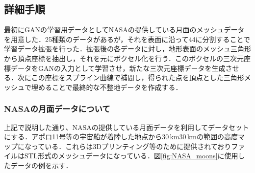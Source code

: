 \documentclass[uplatex,twocolumn, dvipdfmx]{jsarticle}  %
\begin{document}
\subsection{詳細手順}
最初にGANの学習用データとしてNASAの提供している月面のメッシュデータを用意した．25種類のデータがあるが，それを表面に沿って4\times4に分割することで学習データ拡張を行った．拡張後の各データに対し，地形表面のメッシュ三角形から頂点座標を抽出し，それを元にボクセル化を行う．このボクセルの三次元座標データをGANの入力として学習させ，新たな三次元座標データを生成させる．次にこの座標をスプライン曲線で補間し，得られた点を頂点とした三角形メッシュで埋めることで最終的な不整地データを作成する．

\subsubsection{NASAの月面データについて}
上記で説明した通り、NASAの提供している月面データを利用してデータセットにする．アポロ11号等の宇宙船が着陸した地点から$30 \mathrm{\, km}$\times$30\mathrm{\, km}$の範囲の高度マップになっている．これらは3Dプリンティング等のために提供されておりファイルはSTL形式のメッシュデータになっている．図\ref{fig:NASA_moons}に使用したデータの例を示す．
\end{document}
